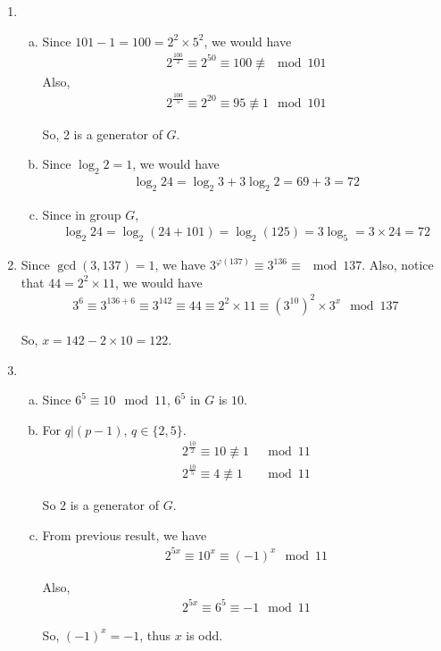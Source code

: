\documentclass[11pt,a4paper]{article}
\begin{document}
\begin{enumerate}
\item \begin{enumerate}[a)]
\item Since $101 - 1 = 100 = 2^{2} \times 5^{2}$, we would have
\begin{align*}
	2^{\frac{100}{2}} \equiv 2^{50} \equiv 100 \not\equiv \mod 101
\end{align*}
Also,
\begin{align*}
	2^{\frac{100}{5}} \equiv 2^{20} \equiv 95 \not\equiv 1 \mod 101
\end{align*}
\par So, $2$ is a generator of $G$.

\item Since $\log_{2}2 = 1$, we would have
\begin{align*}
	\log_{2}24 = \log_{2}3 + 3\log_{2}2 = 69 + 3 = 72
\end{align*}

\item Since in group $G$,
\begin{align*}
	\log_{2}24 = \log_{2}(24 + 101) = \log_{2}(125) = 3\log_{5} = 3 \times 24 = 72
\end{align*}
\end{enumerate}

\item Since $\gcd(3, 137) = 1$, we have $3^{\varphi(137)} \equiv 3^{136} \equiv \mod 137$. Also, notice that $44 = 2^{2} \times 11$, we would have
\begin{align*}
	3^{6} \equiv 3^{136 + 6} \equiv 3^{142} \equiv 44 \equiv 2^{2} \times 11 \equiv (3^{10})^{2} \times 3^{x} \mod 137
\end{align*}
\par So, $x = 142 - 2 \times 10 = 122$.

\item \begin{enumerate}[a)]
\item Since $6^{5} \equiv 10 \mod 11$, $6^{5}$ in $G$ is $10$.

\item For $q \vert (p-1)$, $q \in \{2, 5\}$.
\begin{align*}
	2^{\frac{10}{2}} \equiv 10 \not\equiv 1 &\mod 11 \\
	2^{\frac{10}{5}} \equiv 4 \not\equiv 1 &\mod 11
\end{align*}
\par So $2$ is a generator of $G$.

\item From previous result, we have
\begin{align*}
	2^{5x} \equiv 10^{x} \equiv (-1)^{x} \mod 11
\end{align*}
\par Also,
\begin{align*}
	2^{5x} \equiv 6^{5} \equiv -1 \mod 11
\end{align*}
\par So, $(-1)^{x} = -1$, thus $x$ is odd.
\end{enumerate}
\end{enumerate}
\end{document}
